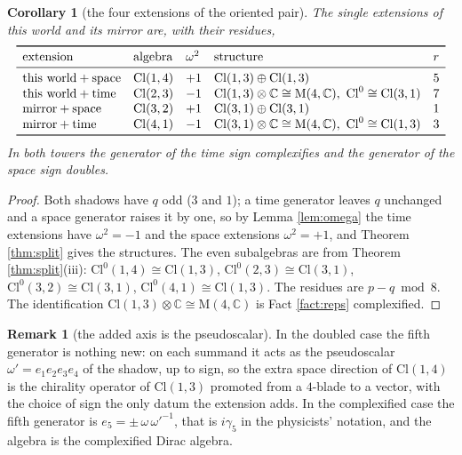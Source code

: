 \documentclass[11pt]{article}
\newtheorem{corollary}[theorem]{Corollary}
\theoremstyle{definition}
\newtheorem{remark}[theorem]{Remark}
\newcommand{\Cl}{\mathrm{Cl}}
\newcommand{\C}{\mathbb{C}}
\newcommand{\Mat}{\mathrm{M}}
\begin{document}
\begin{corollary}[the four extensions of the oriented pair]\label{cor:four}
The single extensions of this world and its mirror are, with their residues,
\[
\begin{array}{lllll}
\toprule
\text{extension} & \text{algebra} & \omega^{2} & \text{structure} & r \\
\midrule
\text{this world} + \text{space} & \Cl(1,4) & +1 & \Cl(1,3) \oplus \Cl(1,3) & 5 \\
\text{this world} + \text{time}  & \Cl(2,3) & -1 & \Cl(1,3) \otimes \C \cong \Mat(4,\C), \ \Cl^{0} \cong \Cl(3,1) & 7 \\
\text{mirror} + \text{space}     & \Cl(3,2) & +1 & \Cl(3,1) \oplus \Cl(3,1) & 1 \\
\text{mirror} + \text{time}      & \Cl(4,1) & -1 & \Cl(3,1) \otimes \C \cong \Mat(4,\C), \ \Cl^{0} \cong \Cl(1,3) & 3 \\
\bottomrule
\end{array}
\]
In both towers the generator of the time sign complexifies and the generator of the space sign doubles.
\end{corollary}

\begin{proof}
Both shadows have $q$ odd ($3$ and $1$); a time generator leaves $q$ unchanged and a space generator raises it by one, so by Lemma \ref{lem:omega} the time extensions have $\omega^{2} = -1$ and the space extensions $\omega^{2} = +1$, and Theorem \ref{thm:split} gives the structures. The even subalgebras are from Theorem \ref{thm:split}(iii): $\Cl^{0}(1,4) \cong \Cl(1,3)$, $\Cl^{0}(2,3) \cong \Cl(3,1)$, $\Cl^{0}(3,2) \cong \Cl(3,1)$, $\Cl^{0}(4,1) \cong \Cl(1,3)$. The residues are $p - q \bmod 8$. The identification $\Cl(1,3) \otimes \C \cong \Mat(4,\C)$ is Fact \ref{fact:reps} complexified.
\end{proof}

\begin{remark}[the added axis is the pseudoscalar]\label{rem:pseudo}
In the doubled case the fifth generator is nothing new: on each summand it acts as the pseudoscalar $\omega' = e_{1}e_{2}e_{3}e_{4}$ of the shadow, up to sign, so the extra space direction of $\Cl(1,4)$ is the chirality operator of $\Cl(1,3)$ promoted from a $4$-blade to a vector, with the choice of sign the only datum the extension adds. In the complexified case the fifth generator is $e_{5} = \pm\,\omega\,\omega'^{-1}$, that is $i\gamma_{5}$ in the physicists' notation, and the algebra is the complexified Dirac algebra.
\end{remark}
\end{document}
